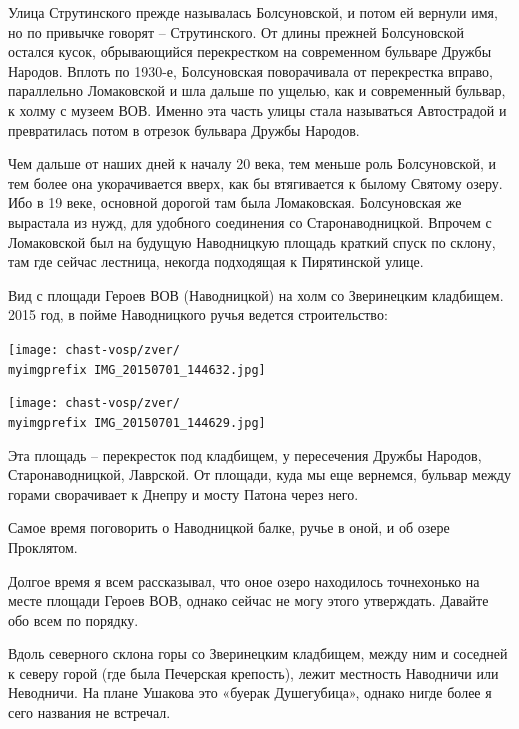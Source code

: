Улица Струтинского прежде называлась Болсуновской, и потом ей вернули имя, но по привычке говорят – Струтинского. От длины прежней Болсуновской остался кусок, обрывающийся перекрестком на современном бульваре Дружбы Народов. Вплоть по 1930-е, Болсуновская поворачивала от перекрестка вправо, параллельно Ломаковской и шла дальше по ущелью, как и современный бульвар, к холму с музеем ВОВ. Именно эта часть улицы стала называться Автострадой и превратилась потом в отрезок бульвара Дружбы Народов.

Чем дальше от наших дней к началу 20 века, тем меньше роль Болсуновской, и тем более она укорачивается вверх, как бы втягивается к былому Святому озеру. Ибо в 19 веке, основной дорогой там была Ломаковская. Болсуновская же вырастала из нужд, для удобного соединения со Старонаводницкой. Впрочем с Ломаковской был на будущую Наводницкую площадь краткий спуск по склону, там где сейчас лестница, некогда подходящая к Пирятинской улице.

Вид с площади Героев ВОВ (Наводницкой) на холм со Зверинецким кладбищем. 2015 год, в пойме Наводницкого ручья ведется строительство:

\begin{center}
\texttt{[image: chast-vosp/zver/\\myimgprefix IMG\_20150701\_144632.jpg]}
\end{center}

\begin{center}
\texttt{[image: chast-vosp/zver/\\myimgprefix IMG\_20150701\_144629.jpg]}
\end{center}

Эта площадь – перекресток под кладбищем, у пересечения Дружбы Народов, Старонаводницкой, Лаврской. От площади, куда мы еще вернемся, бульвар между горами сворачивает к Днепру и мосту Патона через него.

Самое время поговорить о Наводницкой балке, ручье в оной, и об озере Проклятом.

Долгое время я всем рассказывал, что оное озеро находилось точнехонько на месте площади Героев ВОВ, однако сейчас не могу этого утверждать. Давайте обо всем по порядку.

Вдоль северного склона горы со Зверинецким кладбищем, между ним и соседней к северу горой (где была Печерская крепость), лежит местность Наводничи или Неводничи. На плане Ушакова это «буерак Душегубица», однако нигде более я сего названия не встречал.

 
